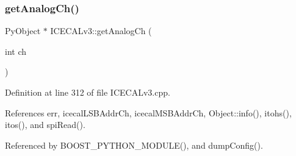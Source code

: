 \subsubsection{\texorpdfstring{get\+Analog\+Ch()}{getAnalogCh()}}
{\footnotesize\ttfamily Py\+Object $\ast$ I\+C\+E\+C\+A\+Lv3\+::get\+Analog\+Ch (\begin{DoxyParamCaption}\item[{int}]{ch }\end{DoxyParamCaption})}



Definition at line 312 of file I\+C\+E\+C\+A\+Lv3.\+cpp.



References err, icecal\+L\+S\+B\+Addr\+Ch, icecal\+M\+S\+B\+Addr\+Ch, Object\+::info(), itohs(), itos(), and spi\+Read().



Referenced by B\+O\+O\+S\+T\+\_\+\+P\+Y\+T\+H\+O\+N\+\_\+\+M\+O\+D\+U\+L\+E(), and dump\+Config().


